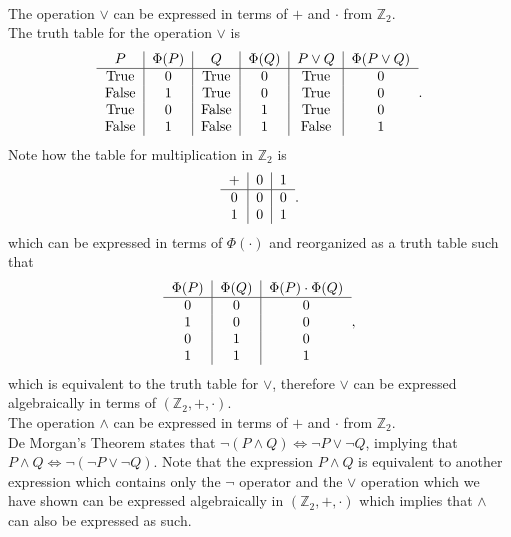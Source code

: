 \documentclass{article}
\begin{document}
\\[0.05in] The operation $\vee$ can be expressed in terms of $+$ and $\cdot$ from $\mathbb{Z}_2$. 
\\[0.05in] The truth table for the operation $\vee$ is 
\begin{equation*}
\begin{tabular}{c | c | c | c | c | c}
$P$          & $\Phi(P)$ & $Q$          & $\Phi(Q)$ & $P\vee Q$ & $\Phi(P\vee Q)$\\ \hline
\text{True}  &    0    & \text{True}  &   0      & True        &      0           \\ 
\text{False} &    1    & \text{True}  &   0      & True        &      0           \\
\text{True}  &    0    & \text{False} &   1      & True        &      0           \\
\text{False} &    1    & \text{False} &   1      & False       &      1
\end{tabular}.
\end{equation*}
Note how the table for multiplication in $\mathbb{Z}_2$ is
\begin{equation*}
\begin{tabular}{c | c | c}
+ & 0 & 1 \\ \hline
0 & 0 & 0 \\ 
1 & 0 & 1 \\
\end{tabular}.
\end{equation*}
which can be expressed in terms of $\Phi(\cdot)$ and reorganized as a truth table such that
\begin{equation*}
\begin{tabular}{c | c | c}
$\Phi(P)$ & $\Phi(Q)$ & $\Phi(P)\cdot \Phi(Q)$ \\ \hline
 0        &    0      & 0 \\
 1        &    0      & 0 \\
 0        &    1      & 0 \\
 1        &    1      & 1 \\
\end{tabular},
\end{equation*}
which is equivalent to the truth table for $\vee$, therefore $\vee$ can be expressed algebraically in terms of $(\mathbb{Z}_2, + , \cdot)$.
\\[0.05in] The operation $\wedge$ can be expressed in terms of $+$ and $\cdot$ from $\mathbb{Z}_2$. 
\\[0.05in] De Morgan's Theorem states that $\neg(P \wedge Q) \Longleftrightarrow \neg P \vee \neg Q$, implying that $P \wedge Q \Longleftrightarrow \neg(\neg P \vee \neg Q)$. Note that the expression $P \wedge Q$ is equivalent to another expression which contains only the $\neg$ operator and the $\vee$ operation which we have shown can be expressed algebraically in $(\mathbb{Z}_2, +, \cdot)$ which implies that $\wedge$ can also be expressed as such.
\end{document}
